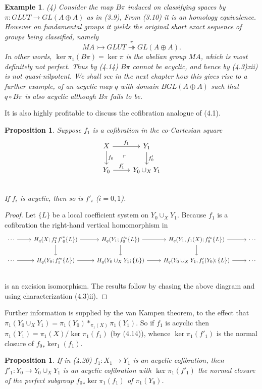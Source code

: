 \documentclass[openany,leqno]{book}  %
\newtheorem{prop}[theorem]{Proposition}
\newtheorem{ex}[theorem]{Example}
\begin{document}
\begin{ex}
(4) Consider the map $B\pi$ induced on classifying spaces by $\pi \colon   GLUT \longrightarrow GL(A\oplus A)$ as in (3.9), From (3.10) it is an homology equivalence. However on fundamental groups it yields the original short exact sequence of groups being classified, namely
\[ MA \rightarrowtail GLUT \overset{\pi}\twoheadrightarrow GL(A\oplus A).\]
In other words, $\ker \pi_1(B\pi) = \ker \pi$ is the abelian group $MA$, which is most definitely not perfect. Thus by (4.14) $B\pi$  cannot be acyclic, and hence by (4.3)xii) is not quasi-nilpotent. We shall see
in the next chapter how this gives rise to a further example, of an acyclic map $q$ with domain $BGL(A\oplus A)$ such that $q\circ B\pi$  is also acyclic although $B\pi$  fails to be.
\end{ex}
It is also highly profitable to discuss the cofibration analogue of (4.1).
\begin{prop}
	Suppose $f_1$ is a cofibration in the co-Cartesian square
\[
\begin{tikzcd}
X \arrow{r}{f_1} \arrow{d}{f_0} \arrow[dr, phantom, "\ulcorner"]& Y_1 \arrow{d}{f'_0}\\
Y_0 \arrow{r}{f'_1} & Y_0\cup_X Y_1 \\
\end{tikzcd}
\]
If $f_i$ is acyclic, then so is $f'_i$ ($i = 0,1$).
\end{prop}
\begin{proof}
Let $\{ L\}$ be a local coefficient system on $Y_0\cup_X Y_1$. Because $f_1$ is a cofibration the right-hand vertical homomorphism in
\[\begin{tikzcd}
\cdots \arrow{r} & H_q(X;f_1^* {f'}_0^*\{L\}) \arrow{r} \arrow{d} &
 H_q(Y_1;f'^*_0\{L\}) \arrow{r} \arrow{d} &
  H_q(Y_1,f_1(X);f'^*_0\{L\})\arrow{d} \arrow{r} & \cdots \\
\cdots \arrow{r} & H_q(Y_0;f'^*_1\{L\}) \arrow{r} &
 H_q(Y_0\cup_X Y_1;\{L\}) \arrow{r}  &
  H_q(Y_0\cup_X Y_1,f'_1(Y_0);\{L\}) \arrow{r} & \cdots \\
\end{tikzcd}\]
 is an excision isomorphism. The results follow by chasing the above diagram and using characterization (4.3)ii).
\end{proof}

Further information is supplied by the van Kampen theorem, to the effect that  $\pi_1(Y_0\cup_X Y_1) = \pi_1(Y_0)*_{\pi_1(X)}\pi_1(Y_1)$. So if $f_1$ is acyclic then $\pi_1(Y_1)=\pi_1(X)/\ker \pi_1(f_1) $
(by (4.14)), whence $\ker \pi_1(f'_1)$ is the normal closure of ${f_0}_*\ker_1(f_1)$.
\begin{prop}
	If in (4.20) $f_1\colon  X_1\longrightarrow Y_1$ is an acyclic cofibration, then $f'_1\colon  Y_0\longrightarrow Y_0\cup_X Y_1$ is an
acyclic cofibration with $\ker \pi_1(f'_1)$ the normal closure of the perfect subgroup ${f_0}_* \ker \pi_1(f_1)$ of $\pi_1(Y_0)$.
\end{prop}
 
\end{document}
